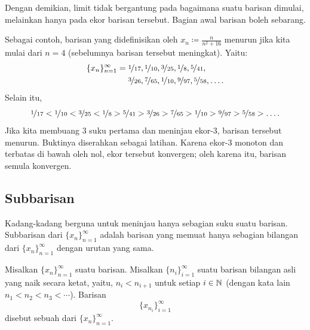 Dengan demikian, limit tidak bergantung pada bagaimana suatu barisan dimulai, melainkan hanya
pada ekor barisan tersebut.  Bagian awal barisan
boleh sebarang.

Sebagai contoh, barisan yang didefinisikan oleh $x_n \coloneqq \frac{n}{n^2+16}$ menurun
jika kita mulai dari $n=4$ (sebelumnya barisan tersebut meningkat).  Yaitu:
\begin{equation*}
\begin{aligned}
\{ x_n \}_{n=1}^\infty
={}& \nicefrac{1}{17}, \nicefrac{1}{10}, \nicefrac{3}{25}, \nicefrac{1}{8}, \nicefrac{5}{41},
\\
&
\nicefrac{3}{26}, \nicefrac{7}{65}, \nicefrac{1}{10},
\nicefrac{9}{97}, \nicefrac{5}{58},\ldots .
\end{aligned}
\end{equation*}
Selain itu,
\begin{equation*}
\nicefrac{1}{17} <
\nicefrac{1}{10} <
\nicefrac{3}{25} <
\nicefrac{1}{8} >
\nicefrac{5}{41} >
\nicefrac{3}{26} >
\nicefrac{7}{65} >
\nicefrac{1}{10} >
\nicefrac{9}{97} >
\nicefrac{5}{58} > \ldots .
\end{equation*}
Jika kita membuang 3 suku pertama
dan meninjau ekor-3, barisan tersebut menurun.  Buktinya diserahkan sebagai latihan.  Karena ekor-3
monoton dan terbatas di bawah oleh nol, ekor tersebut konvergen; oleh karena itu, barisan semula konvergen.

\subsection{Subbarisan}

Kadang-kadang berguna untuk meninjau hanya sebagian suku suatu barisan.
Subbarisan dari $\{ x_n \}_{n=1}^\infty$ adalah barisan yang memuat
hanya sebagian bilangan dari $\{ x_n \}_{n=1}^\infty$ dengan urutan yang sama.

\begin{defn}
Misalkan $\{ x_n \}_{n=1}^\infty$ suatu barisan.
Misalkan $\{ n_i \}_{i=1}^\infty$ suatu barisan bilangan asli yang naik
secara ketat, yaitu, $n_i < n_{i+1}$ untuk setiap $i \in {\mathbb{N}}$ (dengan kata lain $n_1 < n_2 < n_3 < \cdots$).  
Barisan
\begin{equation*}
\{ x_{n_i} \}_{i=1}^\infty
\end{equation*}
disebut 
sebuah \emph{} dari $\{ x_n \}_{n=1}^\infty$.
\end{defn}

